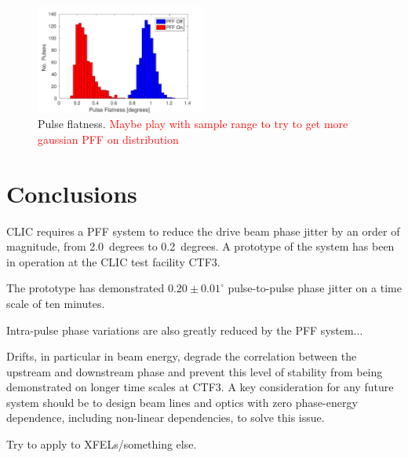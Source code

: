 \documentclass[%
 reprint,
 amsmath,amssymb,
 aps,
]{revtex4-1}
\begin{document}
\begin{figure}
	\includegraphics[width=0.5\textwidth]{figs/flatness}%
	\caption{\label{fig:flatness}Pulse flatness. \textcolor{red}{Maybe play 
	with sample range to try to get more gaussian PFF on distribution}}
\end{figure}

%
%
%

\section{\label{s:conc}Conclusions}

CLIC requires a PFF system to reduce the drive beam phase jitter by an order of 
magnitude, from 2.0~degrees to 0.2~degrees. A prototype of the system has been 
in operation at the CLIC test facility CTF3.

The prototype has demonstrated \(0.20\pm0.01^\circ\) pulse-to-pulse 
phase jitter on a time scale of ten minutes. 

Intra-pulse phase variations are also greatly reduced by the PFF system...

Drifts, in particular in beam energy, degrade the correlation between the 
upstream and downstream phase and prevent this level of stability from being 
demonstrated on longer time scales at CTF3. A key consideration for any future 
system should be to design beam lines and optics with zero phase-energy 
dependence, including non-linear dependencies, to solve this issue.

Try to apply to XFELs/something else.

\end{document}
